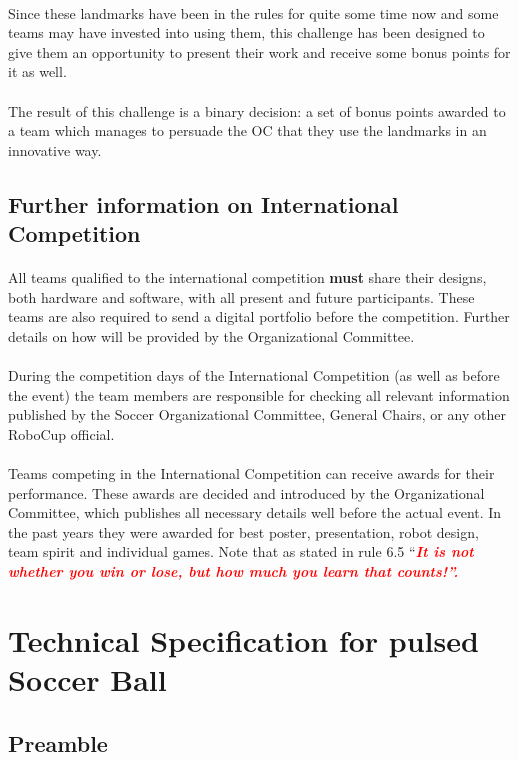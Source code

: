 \documentclass{article}
\renewcommand\thesubsection{\arabic{section}.\arabic{subsection}}
\newcommand*{\p}{\paragraph{}}
\begin{document}
\p Since these landmarks have been in the rules for quite some
    time now and some teams may have invested into using them, this challenge
    has been designed to give them an opportunity to present their work and
    receive some bonus points for it as well.

\p The result of this challenge is a binary decision: a set of
    bonus points awarded to a team which manages to persuade the OC that they
    use the landmarks in an innovative way.

\subsection{Further information on International Competition \label{ref-061}}

\p All teams qualified to the international competition \textbf{must} share their
designs, both hardware and software, with all present and future participants.
These teams are also required to send a digital portfolio before the
competition. Further details on how will be provided by the Organizational
Committee.

\p During the competition days of the International Competition (as well as before
the event) the team members are responsible for checking all relevant
information published by the Soccer Organizational Committee, General Chairs,
or any other RoboCup official.

\p Teams competing in the International Competition can receive awards for their
performance. These awards are decided and introduced by the Organizational
Committee, which publishes all necessary details well before the actual event.
In the past years they were awarded for best poster, presentation, robot
design, team spirit and individual games. Note that as stated in rule 6.5
``\textbf{\textit{\textcolor{red}{It is not whether you win or lose, but how
much you learn that counts!''.}}}

\newpage
\appendix
{}
\renewcommand\thesubsection{\Alph{section}.\arabic{subsection}}

\section{Technical Specification for pulsed Soccer Ball\label{ref-pulsed-spec}}

\subsection{Preamble}
\end{document}
